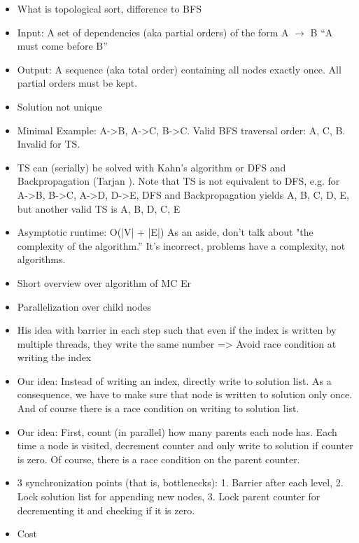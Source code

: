  
 \begin{invisible}
 \begin{itemize}
  \item What is topological sort, difference to BFS
  \item Input: A set of dependencies (aka partial orders) of the form A $\rightarrow$ B ``A must come before B''
  \item Output: A sequence (aka total order) containing all nodes exactly once. All partial orders must be kept.
  \item Solution not unique
  \item Minimal Example: A->B, A->C, B->C. Valid BFS traversal order: A, C, B. Invalid for TS.
  \item TS can (serially) be solved with Kahn's algorithm \cite{kahn1962topological} or DFS and Backpropagation (Tarjan \cite{tarjan1976edge}). %
        Note that TS is not equivalent to DFS, e.g. for A->B, B->C, A->D, D->E, DFS and Backpropagation yields A, B, C, D, E, but another valid TS is A, B, D, C, E
  \item Asymptotic runtime: O(|V| + |E|)
As an aside, don't talk about "the complexity of the algorithm.'' It's incorrect,
problems have a complexity, not algorithms.  
 \end{itemize}

 \begin{itemize}
  \item Short overview over algorithm of MC Er
  \item Parallelization over child nodes
  \item His idea with barrier in each step such that even if the index is written by multiple threads, they write the same number => Avoid race condition at writing the index
  \item Our idea: Instead of writing an index, directly write to solution list. As a consequence, we have to make sure that node is written to solution only once. And of course there is a race condition on writing to solution list.
  \item Our idea: First, count (in parallel) how many parents each node has. Each time a node is visited, decrement counter and only write to solution if counter is zero. Of course, there is a race condition on the parent counter.
  \item 3 synchronization points (that is, bottlenecks): 1. Barrier after each level, 2. Lock solution list for appending new nodes, 3. Lock parent counter for decrementing it and checking if it is zero.
  \item Cost
 \end{itemize}

 
\end{invisible}
